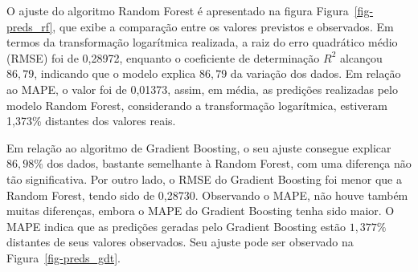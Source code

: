 \documentclass[
  12pt,
  a4paper,
]{scrreprt}
\begin{document}
\vspace{12pt}

O ajuste do algoritmo Random Forest é apresentado na figura
Figura~\ref{fig-preds_rf}, que exibe a comparação entre os valores
previstos e observados. Em termos da transformação logarítmica
realizada, a raiz do erro quadrático médio (RMSE) foi de 0,28972,
enquanto o coeficiente de determinação \(R^2\) alcançou \(86,79%
\), indicando que o modelo explica \(86,79%
\) da variação dos dados. Em relação ao MAPE, o valor foi de 0,01373,
assim, em média, as predições realizadas pelo modelo Random Forest,
considerando a transformação logarítmica, estiveram 1,373\% distantes
dos valores reais.

\vspace{12pt}

Em relação ao algoritmo de Gradient Boosting, o seu ajuste consegue
explicar \(86,98\%\) dos dados, bastante semelhante à Random Forest, com
uma diferença não tão significativa. Por outro lado, o RMSE do Gradient
Boosting foi menor que a Random Forest, tendo sido de 0,28730.
Observando o MAPE, não houve também muitas diferenças, embora o MAPE do
Gradient Boosting tenha sido maior. O MAPE indica que as predições
geradas pelo Gradient Boosting estão \(1,377\%\) distantes de seus
valores observados. Seu ajuste pode ser observado na
Figura~\ref{fig-preds_gdt}.
\end{document}
